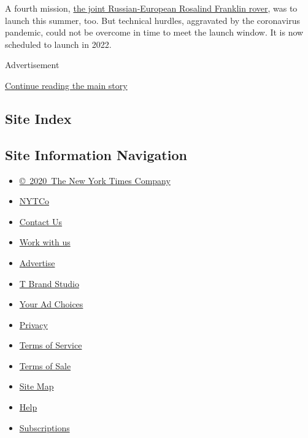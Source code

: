 A fourth mission,
\href{https://www.nytimes3xbfgragh.onion/2020/03/12/science/mars-rover-coronavirus.html}{the
joint Russian-European Rosalind Franklin rover}, was to launch this
summer, too. But technical hurdles, aggravated by the coronavirus
pandemic, could not be overcome in time to meet the launch window. It is
now scheduled to launch in 2022.

Advertisement

\protect\hyperlink{after-bottom}{Continue reading the main story}

\hypertarget{site-index}{%
\subsection{Site Index}\label{site-index}}

\hypertarget{site-information-navigation}{%
\subsection{Site Information
Navigation}\label{site-information-navigation}}

\begin{itemize}
\tightlist
\item
  \href{https://help.nytimes3xbfgragh.onion/hc/en-us/articles/115014792127-Copyright-notice}{©~2020~The
  New York Times Company}
\end{itemize}

\begin{itemize}
\tightlist
\item
  \href{https://www.nytco.com/}{NYTCo}
\item
  \href{https://help.nytimes3xbfgragh.onion/hc/en-us/articles/115015385887-Contact-Us}{Contact
  Us}
\item
  \href{https://www.nytco.com/careers/}{Work with us}
\item
  \href{https://nytmediakit.com/}{Advertise}
\item
  \href{http://www.tbrandstudio.com/}{T Brand Studio}
\item
  \href{https://www.nytimes3xbfgragh.onion/privacy/cookie-policy\#how-do-i-manage-trackers}{Your
  Ad Choices}
\item
  \href{https://www.nytimes3xbfgragh.onion/privacy}{Privacy}
\item
  \href{https://help.nytimes3xbfgragh.onion/hc/en-us/articles/115014893428-Terms-of-service}{Terms
  of Service}
\item
  \href{https://help.nytimes3xbfgragh.onion/hc/en-us/articles/115014893968-Terms-of-sale}{Terms
  of Sale}
\item
  \href{https://spiderbites.nytimes3xbfgragh.onion}{Site Map}
\item
  \href{https://help.nytimes3xbfgragh.onion/hc/en-us}{Help}
\item
  \href{https://www.nytimes3xbfgragh.onion/subscription?campaignId=37WXW}{Subscriptions}
\end{itemize}
